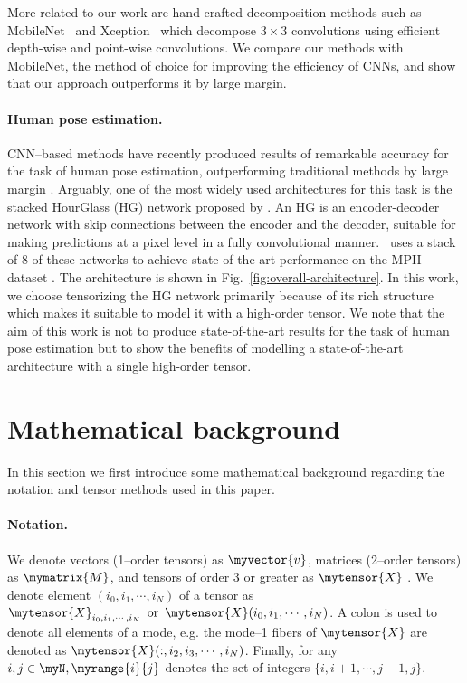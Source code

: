 \documentclass[10pt,twocolumn,letterpaper]{article}
\begin{document}
More related to our work are hand-crafted decomposition methods such as MobileNet~\cite{howard2017mobilenets} and Xception~\cite{chollet2017xception} which decompose $3 \times 3$ convolutions using efficient depth-wise and point-wise convolutions. We compare our methods with MobileNet, the method of choice for improving the efficiency of CNNs, and show that our approach outperforms it by large margin. 

\paragraph{Human pose estimation.} CNN--based methods have recently produced results of remarkable accuracy for the task of human pose estimation, outperforming traditional methods by large margin \cite{toshev2014deeppose,tompson2014joint,pfister2015flowing, bulat2016human,newell2016stacked, wei2016convolutional}. Arguably, one of the most widely used architectures for this task is the stacked HourGlass (HG) network proposed by \cite{newell2016stacked}. An HG is an encoder-decoder network with skip connections between the encoder and the decoder, suitable for making predictions at a pixel level in a fully convolutional manner. \cite{newell2016stacked}~uses a stack of 8 of these networks to achieve state-of-the-art performance on the MPII dataset \cite{andriluka20142d}. The architecture is shown in Fig.~\ref{fig:overall-architecture}. In this work, we choose tensorizing the HG network primarily because of its rich structure which makes it suitable to model it with a high-order tensor. We note that the aim of this work is not to produce state-of-the-art results for the task of human pose estimation but to show the benefits of modelling a state-of-the-art architecture with a single high-order tensor. 



 \section{Mathematical background}\label{sec:math-background}

In this section we first introduce some mathematical background regarding the notation and tensor methods used in this paper.

\paragraph{Notation.} We denote vectors (1\myst--order tensors) as \(\myvector{v}\), matrices (2\mynd--order tensors) as \(\mymatrix{M}\), and tensors of order 3 or greater as  \(\mytensor{X}\) . We denote element \((i_0, i_1, \cdots, i_N)\) of a tensor as \(\mytensor{X}_{i_0, i_1, \cdots, i_N} \,\text{ or } \, \mytensor{X}(i_0, i_1, \cdots, i_N)\). A colon is used to denote all elements of a mode, e.g. the mode--1 fibers of \(\mytensor{X}\) are denoted as \(\mytensor{X}(:, i_2, i_3, \cdots, i_N)\). 
Finally, for any \(i, j \in \myN, \myrange{i}{j}\) denotes the set of integers \(\{ i, i+1, \cdots , j-1, j\}\).
\end{document}
